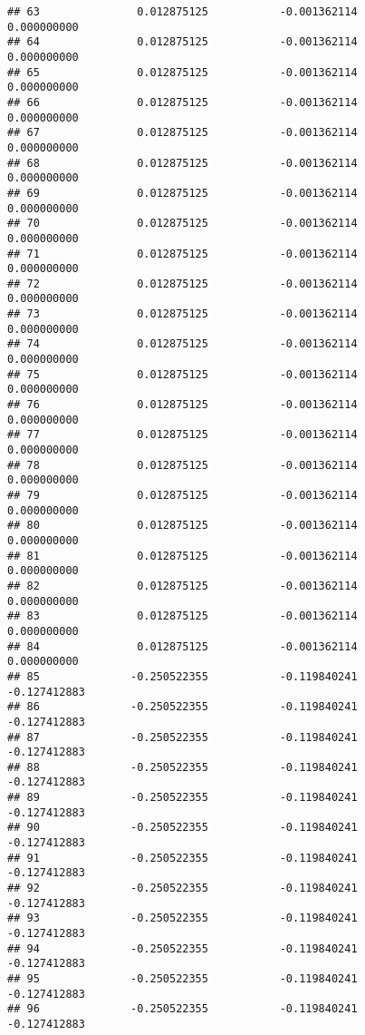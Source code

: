 \documentclass[]{article}
\begin{document}
\begin{verbatim}
## 63               0.012875125           -0.001362114            0.000000000
## 64               0.012875125           -0.001362114            0.000000000
## 65               0.012875125           -0.001362114            0.000000000
## 66               0.012875125           -0.001362114            0.000000000
## 67               0.012875125           -0.001362114            0.000000000
## 68               0.012875125           -0.001362114            0.000000000
## 69               0.012875125           -0.001362114            0.000000000
## 70               0.012875125           -0.001362114            0.000000000
## 71               0.012875125           -0.001362114            0.000000000
## 72               0.012875125           -0.001362114            0.000000000
## 73               0.012875125           -0.001362114            0.000000000
## 74               0.012875125           -0.001362114            0.000000000
## 75               0.012875125           -0.001362114            0.000000000
## 76               0.012875125           -0.001362114            0.000000000
## 77               0.012875125           -0.001362114            0.000000000
## 78               0.012875125           -0.001362114            0.000000000
## 79               0.012875125           -0.001362114            0.000000000
## 80               0.012875125           -0.001362114            0.000000000
## 81               0.012875125           -0.001362114            0.000000000
## 82               0.012875125           -0.001362114            0.000000000
## 83               0.012875125           -0.001362114            0.000000000
## 84               0.012875125           -0.001362114            0.000000000
## 85              -0.250522355           -0.119840241           -0.127412883
## 86              -0.250522355           -0.119840241           -0.127412883
## 87              -0.250522355           -0.119840241           -0.127412883
## 88              -0.250522355           -0.119840241           -0.127412883
## 89              -0.250522355           -0.119840241           -0.127412883
## 90              -0.250522355           -0.119840241           -0.127412883
## 91              -0.250522355           -0.119840241           -0.127412883
## 92              -0.250522355           -0.119840241           -0.127412883
## 93              -0.250522355           -0.119840241           -0.127412883
## 94              -0.250522355           -0.119840241           -0.127412883
## 95              -0.250522355           -0.119840241           -0.127412883
## 96              -0.250522355           -0.119840241           -0.127412883

\end{verbatim}
\end{document}
